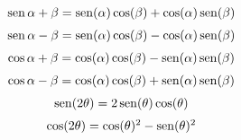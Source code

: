 \begin{multicols}{2}
\begin{tcolorbox}[hbox, title=Razones trigonométicas de sumas de ángulos]
\begin{minipage}{0.4\textwidth}
\[
\renewcommand{\arraystretch}{1.5}
\begin{array}{c}
\sen{\alpha+\beta}=\sen(\alpha)\cos(\beta)+\cos(\alpha)\sen(\beta) \\
\sen{\alpha-\beta}=\sen(\alpha)\cos(\beta)-\cos(\alpha)\sen(\beta) \\
\cos{\alpha+\beta}=\cos(\alpha)\cos(\beta)-\sen(\alpha)\sen(\beta) \\
\cos{\alpha-\beta}=\cos(\alpha)\cos(\beta)+\sen(\alpha)\sen(\beta) \\
\sen(2\theta)=2\sen(\theta)\cos(\theta)                            \\
\cos(2\theta)=\cos(\theta)^2-\sen(\theta)^2
\end{array}
\]
\end{minipage}
\end{tcolorbox}


\end{multicols}

